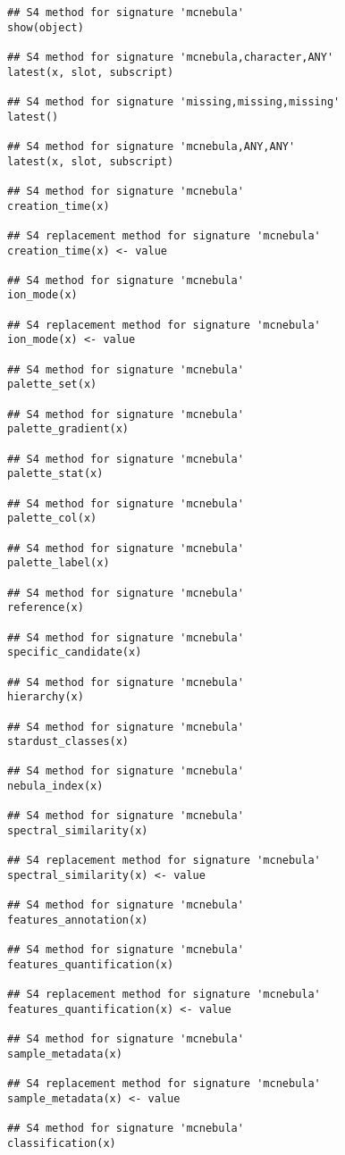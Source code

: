 \documentclass[letterpaper]{book}
\begin{document}
%
\begin{Usage}
\begin{verbatim}
## S4 method for signature 'mcnebula'
show(object)

## S4 method for signature 'mcnebula,character,ANY'
latest(x, slot, subscript)

## S4 method for signature 'missing,missing,missing'
latest()

## S4 method for signature 'mcnebula,ANY,ANY'
latest(x, slot, subscript)

## S4 method for signature 'mcnebula'
creation_time(x)

## S4 replacement method for signature 'mcnebula'
creation_time(x) <- value

## S4 method for signature 'mcnebula'
ion_mode(x)

## S4 replacement method for signature 'mcnebula'
ion_mode(x) <- value

## S4 method for signature 'mcnebula'
palette_set(x)

## S4 method for signature 'mcnebula'
palette_gradient(x)

## S4 method for signature 'mcnebula'
palette_stat(x)

## S4 method for signature 'mcnebula'
palette_col(x)

## S4 method for signature 'mcnebula'
palette_label(x)

## S4 method for signature 'mcnebula'
reference(x)

## S4 method for signature 'mcnebula'
specific_candidate(x)

## S4 method for signature 'mcnebula'
hierarchy(x)

## S4 method for signature 'mcnebula'
stardust_classes(x)

## S4 method for signature 'mcnebula'
nebula_index(x)

## S4 method for signature 'mcnebula'
spectral_similarity(x)

## S4 replacement method for signature 'mcnebula'
spectral_similarity(x) <- value

## S4 method for signature 'mcnebula'
features_annotation(x)

## S4 method for signature 'mcnebula'
features_quantification(x)

## S4 replacement method for signature 'mcnebula'
features_quantification(x) <- value

## S4 method for signature 'mcnebula'
sample_metadata(x)

## S4 replacement method for signature 'mcnebula'
sample_metadata(x) <- value

## S4 method for signature 'mcnebula'
classification(x)
\end{verbatim}
\end{Usage}
\end{document}
